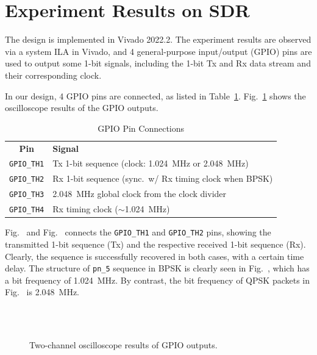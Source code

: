 \documentclass[journal,twoside]{IEEEtran}
\newcommand{\tabvertspace}{\specialrule{0em}{0.08em}{.08em}}
\begin{document}
  \section{Experiment Results on SDR}

    The design is implemented in Vivado 2022.2.
    The experiment results are observed via a system ILA in Vivado,
    and 4 general-purpose input/output (GPIO) pins are used to output some 1-bit signals,
    including the 1-bit Tx and Rx data stream and their corresponding clock.

    In our design, 4 GPIO pins are connected, as listed in Table~\ref{tab:gpio_pins}.
    Fig.~\ref{fig:scope} shows the oscilloscope results of the GPIO outputs.
    \begin{table}[htbp]
      \caption{GPIO Pin Connections}
      \label{tab:gpio_pins}
      \renewcommand{\arraystretch}{1.2}
      \begin{tabularx}{\linewidth}{cX}
        \toprule\tabvertspace
        \textbf{Pin} & \textbf{Signal} \\
        \tabvertspace\midrule
        \texttt{GPIO\_TH1} & Tx 1-bit sequence (clock: \qty{1.024}{MHz} or \qty{2.048}{MHz}) \\
        \texttt{GPIO\_TH2} & Rx 1-bit sequence (sync.\ w/ Rx timing clock when BPSK) \\
        \texttt{GPIO\_TH3} & \qty{2.048}{MHz} global clock from the clock divider \\
        \texttt{GPIO\_TH4} & Rx timing clock ($\sim$\qty{1.024}{MHz}) \\
        \bottomrule
      \end{tabularx}
    \end{table}

    Fig.~ and Fig.~
    connects the \texttt{GPIO\_TH1} and \texttt{GPIO\_TH2} pins,
    showing the transmitted 1-bit sequence (Tx) and the respective received 1-bit sequence (Rx).
    Clearly, the sequence is successfully recovered in both cases, with a certain time delay.
    The structure of \texttt{pn\_5} sequence in BPSK is clearly seen in Fig.~,
    which has a bit frequency of \qty{1.024}{MHz}.
    By contrast, the bit frequency of QPSK packets in Fig.~ is \qty{2.048}{MHz}.



    \begin{figure}[t]
      \centering
      \\
      \\
      \caption{Two-channel oscilloscope results of GPIO outputs.}
      \label{fig:scope}
    \end{figure}
\end{document}
